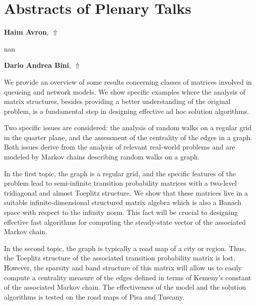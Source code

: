 \documentclass[ILAS2025-program.tex]{subfiles}
\begin{document}
\parindent=0pt

\section{Abstracts of Plenary Talks}
 \hypertarget{down0009}{}\begin{ilasabstract}
    
    \textbf{Haim Avron},  \hfill \hyperlink{up0009}{$\Uparrow$}
    
    \mtskip
    nan\end{ilasabstract}
     \hypertarget{down0005}{}\begin{ilasabstract}
    
    \textbf{Dario Andrea Bini},  \hfill \hyperlink{up0005}{$\Uparrow$}
    
    \mtskip
    We provide an overview of some results concerning classes of matrices involved in queueing and network models. We show specific examples where the analysis of matrix structures, besides providing a better understanding of the original problem, is a fundamental step in designing effective ad hoc solution algorithms.

Two specific issues are considered:  the analysis of random walks on a regular grid in the quarter plane, and the assessment of the centrality of the edges in a graph. Both issues derive from the analysis of relevant real-world problems and are modeled by Markov chains describing random walks on a graph. 

In the first topic, the graph is a regular grid, and the specific features of the problem lead to semi-infinite transition probability matrices with a two-level tridiagonal and almost Toeplitz structure. We show that these matrices live in a suitable infinite-dimensional structured matrix algebra which is also a Banach space with respect to the infinity norm. This fact will be crucial to designing effective fast algorithms for computing the steady-state vector of the associated Markov chain.

In the second topic, the graph is typically a road map of a city or region. Thus, the Toeplitz structure of the associated transition probability matrix is lost. However, the sparsity and band structure of this matrix will allow us to easily compute a centrality measure of the edges defined in terms of Kemeny's constant of the associated Markov chain. The effectiveness of the model and the solution algorithms is tested on the road maps of Pisa and Tuscany.
\end{ilasabstract}
\end{document}
